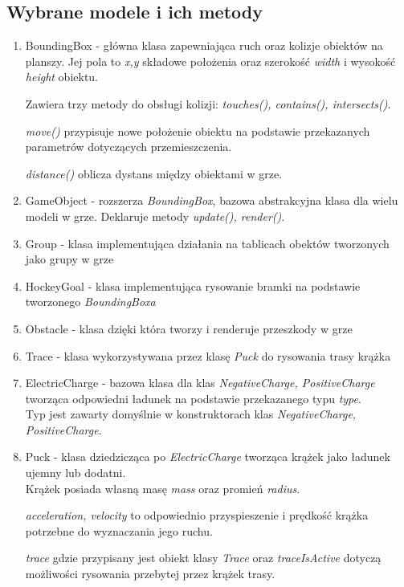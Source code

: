 \documentclass{article}
\begin{document}
\subsection{Wybrane modele i ich metody}
\begin{enumerate}
    \item BoundingBox - główna klasa zapewniająca ruch oraz kolizje obiektów na planszy.
    Jej pola to \textit{x,y} składowe położenia oraz szerokość \textit{width} i wysokość \textit{height} obiektu.
    
    Zawiera trzy metody do obsługi kolizji: \textit{touches(), contains(), intersects()}.
    
    \textit{move()} przypisuje nowe położenie obiektu na podstawie przekazanych parametrów dotyczących przemieszczenia.
    
    \textit{distance()} oblicza dystans między obiektami w grze.
    
    \item GameObject - rozszerza \emph{BoundingBox}, bazowa abstrakcyjna klasa dla wielu modeli w grze. Deklaruje metody \textit{update(), render()}.
    \item Group - klasa implementująca działania na tablicach obektów tworzonych jako grupy w grze
    \item HockeyGoal - klasa implementująca rysowanie bramki na podstawie tworzonego \emph{BoundingBoxa}
    \item Obstacle - klasa dzięki która tworzy i renderuje przeszkody w grze
    \item Trace - klasa wykorzystywana przez klasę \textit{Puck} do rysowania trasy krążka
    \item ElectricCharge - bazowa klasa dla klas \textit{NegativeCharge, PositiveCharge} tworząca odpowiedni ładunek na podstawie przekazanego typu \emph{type}.\\
    Typ jest zawarty domyślnie w konstruktorach klas \textit{NegativeCharge, PositiveCharge}.
    \item Puck - klasa dziedzicząca po \emph{ElectricCharge} tworząca krążek jako ładunek ujemny lub dodatni.\\
    Krążek posiada własną masę \emph{mass} oraz promień \emph{radius}.
    
    \emph{acceleration, velocity} to odpowiednio przyspieszenie i prędkość krążka potrzebne do wyznaczania jego ruchu.
    
    \emph{trace} gdzie przypisany jest obiekt klasy \emph{Trace}  oraz \emph{traceIsActive} dotyczą możliwości rysowania przebytej przez krążek trasy.
    

\end{enumerate}
\end{document}
